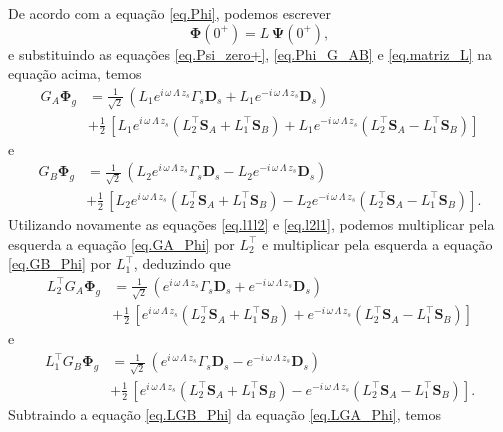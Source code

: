 De acordo com a equa\c{c}\~ao \ref{eq.Phi}, podemos escrever
\begin{equation*}
\mathbf{\Phi}(0^+)=L\,\mathbf{\Psi}(0^+),
\end{equation*}
e substituindo as equa\c{c}\~oes \ref{eq.Psi_zero+}, \ref{eq.Phi_G_AB} e \ref{eq.matriz_L} na equa\c{c}\~ao acima, temos
\begin{align}\label{eq.GA_Phi}
G_A\mathbf{\Phi}_g&=\frac{1}{\sqrt{2}}\,(L_1e^{i\,\omega\,\Lambda\,z_s}\Gamma_s\mathbf{D}_s+L_1e^{-i\,\omega\,\Lambda\,z_s}\mathbf{D}_s)\\\nonumber
&+\frac{1}{2}\,\left[L_1e^{i\,\omega\,\Lambda\,z_s}(L_2^\top\mathbf{S}_A+L_1^\top\mathbf{S}_B)+L_1e^{-i\,\omega\,\Lambda\,z_s}(L_2^\top\mathbf{S}_A-L_1^\top\mathbf{S}_B)\right]
\end{align}
e
\begin{align}\label{eq.GB_Phi}
G_B\mathbf{\Phi}_g&=\frac{1}{\sqrt{2}}\,(L_2e^{i\,\omega\,\Lambda\,z_s}\Gamma_s\mathbf{D}_s-L_2e^{-i\,\omega\,\Lambda\,z_s}\mathbf{D}_s)\\\nonumber
&+\frac{1}{2}\,\left[L_2e^{i\,\omega\,\Lambda\,z_s}(L_2^\top\mathbf{S}_A+L_1^\top\mathbf{S}_B)-L_2e^{-i\,\omega\,\Lambda\,z_s}(L_2^\top\mathbf{S}_A-L_1^\top\mathbf{S}_B)\right].
\end{align}
Utilizando novamente as equa\c{c}\~oes \ref{eq.l1l2} e \ref{eq.l2l1}, podemos multiplicar pela esquerda a equa\c{c}\~ao \ref{eq.GA_Phi} por $L_2^\top$ e multiplicar pela esquerda a equa\c{c}\~ao \ref{eq.GB_Phi} por $L_1^\top$, deduzindo que
\begin{align}\label{eq.LGA_Phi}
L_2^{\top}G_A\mathbf{\Phi}_g&=\frac{1}{\sqrt{2}}\,(e^{i\,\omega\,\Lambda\,z_s}\Gamma_s\mathbf{D}_s+e^{-i\,\omega\,\Lambda\,z_s}\mathbf{D}_s)\\\nonumber
&+\frac{1}{2}\,\left[e^{i\,\omega\,\Lambda\,z_s}(L_2^\top\mathbf{S}_A+L_1^\top\mathbf{S}_B)+e^{-i\,\omega\,\Lambda\,z_s}(L_2^\top\mathbf{S}_A-L_1^\top\mathbf{S}_B)\right]
\end{align}
e
\begin{align}\label{eq.LGB_Phi}
L_1^\top G_B\mathbf{\Phi}_g&=\frac{1}{\sqrt{2}}\,(e^{i\,\omega\,\Lambda\,z_s}\Gamma_s\mathbf{D}_s-e^{-i\,\omega\,\Lambda\,z_s}\mathbf{D}_s)\\\nonumber
&+\frac{1}{2}\,\left[e^{i\,\omega\,\Lambda\,z_s}(L_2^\top\mathbf{S}_A+L_1^\top\mathbf{S}_B)-e^{-i\,\omega\,\Lambda\,z_s}(L_2^\top\mathbf{S}_A-L_1^\top\mathbf{S}_B)\right].
\end{align}
Subtraindo a equa\c{c}\~ao \ref{eq.LGB_Phi} da equa\c{c}\~ao \ref{eq.LGA_Phi}, temos
